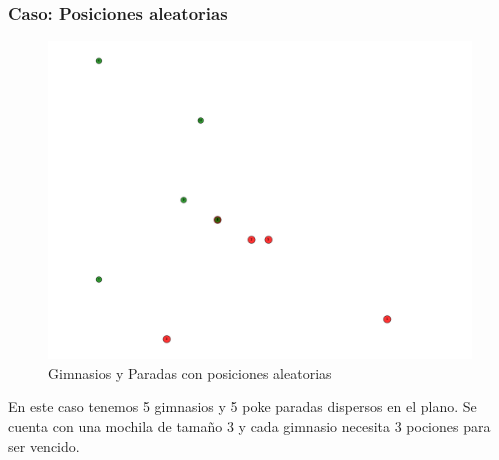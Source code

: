 \subsubsection{Caso: Posiciones aleatorias}

\begin{figure}[H]
  \begin{center}
    \includegraphics[scale=0.4]{imagenes/test4.pdf}
    \caption{Gimnasios y Paradas con posiciones aleatorias}
    \label{fig:ej2_caso4}
  \end{center}
\end{figure}

En este caso tenemos 5 gimnasios y 5 poke paradas dispersos en el plano. Se cuenta con una mochila de tamaño 3 y cada gimnasio necesita 3 pociones para ser vencido.

